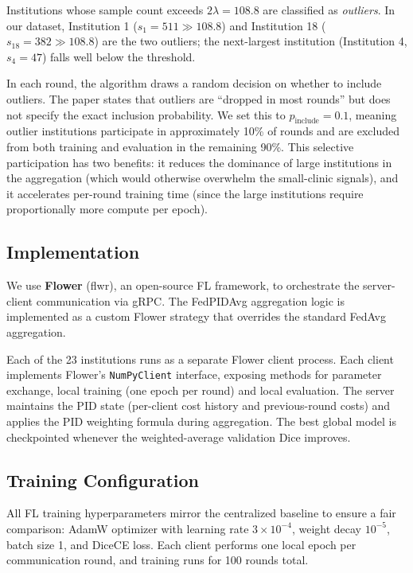 \documentclass{article}
\begin{document}
Institutions whose sample count exceeds $2\lambda = 108.8$ are classified as \textit{outliers}. In our dataset, Institution 1 ($s_1 = 511 \gg 108.8$) and Institution 18 ($s_{18} = 382 \gg 108.8$) are the two outliers; the next-largest institution (Institution 4, $s_4 = 47$) falls well below the threshold.

In each round, the algorithm draws a random decision on whether to include outliers. The paper states that outliers are ``dropped in most rounds'' but does not specify the exact inclusion probability. We set this to $p_{\text{include}} = 0.1$, meaning outlier institutions participate in approximately 10\% of rounds and are excluded from both training and evaluation in the remaining 90\%. This selective participation has two benefits: it reduces the dominance of large institutions in the aggregation (which would otherwise overwhelm the small-clinic signals), and it accelerates per-round training time (since the large institutions require proportionally more compute per epoch).

\subsection{Implementation}

We use \textbf{Flower} (flwr), an open-source FL framework, to orchestrate the server-client communication via gRPC. The FedPIDAvg aggregation logic is implemented as a custom Flower strategy that overrides the standard FedAvg aggregation.

Each of the 23 institutions runs as a separate Flower client process. Each client implements Flower's \texttt{NumPyClient} interface, exposing methods for parameter exchange, local training (one epoch per round) and local evaluation. The server maintains the PID state (per-client cost history and previous-round costs) and applies the PID weighting formula during aggregation. The best global model is checkpointed whenever the weighted-average validation Dice improves.

\subsection{Training Configuration}

All FL training hyperparameters mirror the centralized baseline to ensure a fair comparison: AdamW optimizer with learning rate $3 \times 10^{-4}$, weight decay $10^{-5}$, batch size 1, and DiceCE loss. Each client performs one local epoch per communication round, and training runs for 100 rounds total.
\end{document}
